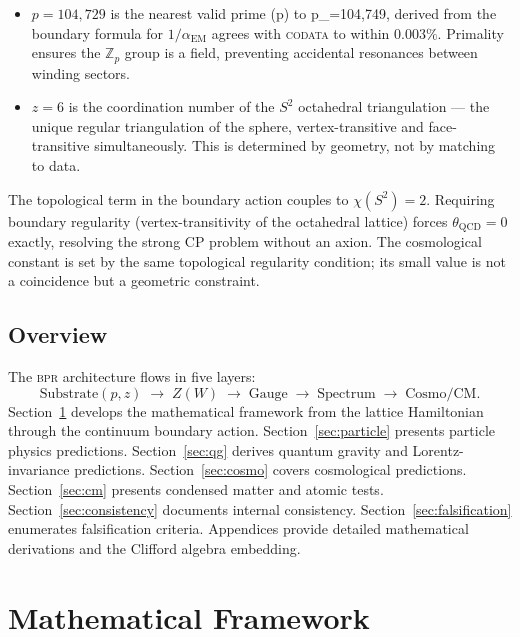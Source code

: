 \documentclass[aps,prd,twocolumn,superscriptaddress,longbibliography,nofootinbib]{revtex4-2}
\newcommand{\Zp}{\mathbb{Z}_p}
\newcommand{\Stwo}{S^2}
\newcommand{\alphaEM}{\alpha_{\mathrm{EM}}}
\newcommand{\Zimp}{Z}
\newcommand{\bpr}{\textsc{bpr}}
\begin{document}
\begin{itemize}
\item $p = 104{,}729$ is the nearest valid prime (p) to p_=104{,}749, derived from the boundary formula
  for $1/\alphaEM$ agrees with \textsc{codata} to within $0.003\%$.
  Primality ensures the $\Zp$ group is a field, preventing accidental
  resonances between winding sectors.
\item $z = 6$ is the coordination number of the $\Stwo$ octahedral triangulation
  --- the unique regular triangulation of the sphere, vertex-transitive and
  face-transitive simultaneously.  This is determined by geometry, not by
  matching to data.
\end{itemize}

The topological term in the boundary action couples to $\chi(\Stwo) = 2$.
Requiring boundary regularity (vertex-transitivity of the octahedral lattice)
forces $\theta_{\mathrm{QCD}} = 0$ exactly, resolving the strong CP problem
without an axion.  The cosmological constant is set by the same topological
regularity condition; its small value is not a coincidence but a geometric
constraint.

\subsection{Overview}

The \bpr{} architecture flows in five layers:
\begin{equation}
\text{Substrate}(p,z) \;\to\; \Zimp(W) \;\to\;
\text{Gauge} \;\to\; \text{Spectrum} \;\to\;
\text{Cosmo/CM}.
\label{eq:architecture}
\end{equation}
Section~\ref{sec:framework} develops the mathematical framework from the
lattice Hamiltonian through the continuum boundary action.
Section~\ref{sec:particle} presents particle physics predictions.
Section~\ref{sec:qg} derives quantum gravity and Lorentz-invariance
predictions.
Section~\ref{sec:cosmo} covers cosmological predictions.
Section~\ref{sec:cm} presents condensed matter and atomic tests.
Section~\ref{sec:consistency} documents internal consistency.
Section~\ref{sec:falsification} enumerates falsification criteria.
Appendices provide detailed mathematical derivations and the
Clifford algebra embedding.


\section{Mathematical Framework}
\label{sec:framework}
\end{document}
